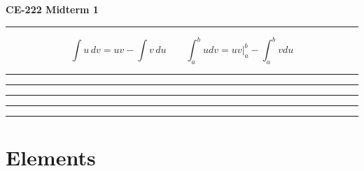 \documentclass[9pt,landscape]{article}
\begin{document}
\raggedright
\footnotesize
\begin{multicols}{2}


\setlength{\premulticols}{1pt}
\setlength{\postmulticols}{1pt}
\setlength{\multicolsep}{1pt}
\setlength{\columnsep}{2pt}

\begin{center}
     \Large{\textbf{CE-222 Midterm 1}} \\
\end{center}

\vspace{2mm}


\hrule



$$\int u \, d v=u v-\int v \, d u \qquad \int_{a}^{b} u d v=\left.u v\right|_{a} ^{b}-\int_{a}^{b} v d u$$

\vspace{1.0mm}

\hrule
\vspace{1.1mm}

\vspace{1.0mm}

\hrule
\vspace{1.5mm}

\vspace{1.5mm}

\hrule
\vspace{1.5mm}


\vspace{1.5mm}

\hrule
\vspace{1.5mm}


\vspace{1.5mm}

\hrule
\vspace{1.5mm}

\section{Elements}


\end{multicols}
\end{document}

